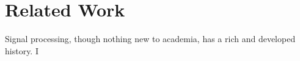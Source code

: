 \chapter{Related Work}
\label{chap:relwork}

Signal processing, though nothing new to academia, has a rich and developed history. I 





